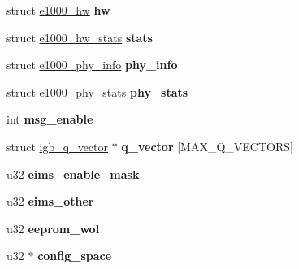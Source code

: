 \begin{DoxyCompactItemize}
\item 
\hypertarget{structigb__adapter_af3e7fe1553ee2190e079ef4b04460471}{
struct \hyperlink{structe1000__hw}{e1000\_\-hw} {\bfseries hw}}
\label{structigb__adapter_af3e7fe1553ee2190e079ef4b04460471}

\item 
\hypertarget{structigb__adapter_aeb8f2135d42ec4214edef82c33c9e773}{
struct \hyperlink{structe1000__hw__stats}{e1000\_\-hw\_\-stats} {\bfseries stats}}
\label{structigb__adapter_aeb8f2135d42ec4214edef82c33c9e773}

\item 
\hypertarget{structigb__adapter_a052bf35742ef891c1911d50c704cc2d1}{
struct \hyperlink{structe1000__phy__info}{e1000\_\-phy\_\-info} {\bfseries phy\_\-info}}
\label{structigb__adapter_a052bf35742ef891c1911d50c704cc2d1}

\item 
\hypertarget{structigb__adapter_a64a431b7e4838d4e7ed70fb2c4010544}{
struct \hyperlink{structe1000__phy__stats}{e1000\_\-phy\_\-stats} {\bfseries phy\_\-stats}}
\label{structigb__adapter_a64a431b7e4838d4e7ed70fb2c4010544}

\item 
\hypertarget{structigb__adapter_a0aa28a1df1b634318be9a718e791db98}{
int {\bfseries msg\_\-enable}}
\label{structigb__adapter_a0aa28a1df1b634318be9a718e791db98}

\item 
\hypertarget{structigb__adapter_ae746c0e64f739bd86a153d974ba4dafb}{
struct \hyperlink{structigb__q__vector}{igb\_\-q\_\-vector} $\ast$ {\bfseries q\_\-vector} \mbox{[}MAX\_\-Q\_\-VECTORS\mbox{]}}
\label{structigb__adapter_ae746c0e64f739bd86a153d974ba4dafb}

\item 
\hypertarget{structigb__adapter_a8327285c6387a4e4aa3307d5d031db67}{
u32 {\bfseries eims\_\-enable\_\-mask}}
\label{structigb__adapter_a8327285c6387a4e4aa3307d5d031db67}

\item 
\hypertarget{structigb__adapter_a82ce4672c65f49a0dcd4ba3965e82f9b}{
u32 {\bfseries eims\_\-other}}
\label{structigb__adapter_a82ce4672c65f49a0dcd4ba3965e82f9b}

\item 
\hypertarget{structigb__adapter_ab45301db0c7902ff04f5e7e4db4ea174}{
u32 {\bfseries eeprom\_\-wol}}
\label{structigb__adapter_ab45301db0c7902ff04f5e7e4db4ea174}

\item 
\hypertarget{structigb__adapter_ac595d1e4845db06a51d64612e66dd16a}{
u32 $\ast$ {\bfseries config\_\-space}}
\label{structigb__adapter_ac595d1e4845db06a51d64612e66dd16a}


\end{DoxyCompactItemize}
